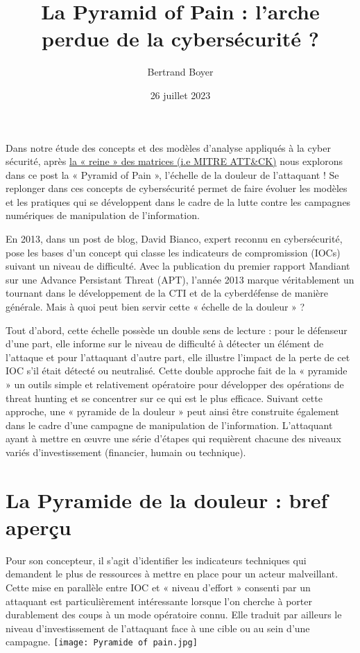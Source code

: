 \documentclass[a4paper]{article}
\title{La Pyramid of Pain : l'arche perdue de la cybersécurité ?}
\author{Bertrand Boyer} %
\date{26 juillet 2023}
\begin{document}
\maketitle                 


Dans notre étude des concepts et des modèles d’analyse appliqués à la cyber sécurité, après \href{https://www.m82-project.com/post/disarm-un-pas-vers-la-cti-pour-lutter-contre-la-désinformation}{la « reine » des matrices (i.e MITRE ATT\&CK)} nous explorons dans ce post la « Pyramid of Pain », l’échelle de la douleur de l’attaquant ! Se replonger dans ces concepts de cybersécurité permet de faire évoluer les modèles et les pratiques qui se développent dans le cadre de la lutte contre les campagnes numériques de manipulation de l’information. 

En 2013, dans un post de blog, David Bianco, expert reconnu en cybersécurité, pose les bases d’un concept qui classe les indicateurs de compromission (IOCs) suivant un niveau de difficulté. Avec la publication du premier rapport Mandiant sur une Advance Persistant Threat (APT), l’année 2013 marque véritablement un tournant dans le développement de la CTI et de la cyberdéfense de manière générale. Mais à quoi peut bien servir cette « échelle de la douleur » ? 

Tout d’abord, cette échelle possède un double sens de lecture : pour le défenseur d'une part, elle informe sur le niveau de difficulté à détecter un élément de l'attaque et pour l'attaquant d’autre part, elle illustre l’impact de la perte de cet IOC s’il était détecté ou neutralisé. Cette double approche fait de la « pyramide » un outils simple et relativement opératoire pour développer des opérations de threat hunting et se concentrer sur ce qui est le plus efficace. Suivant cette approche, une « pyramide de la douleur » peut ainsi être construite également dans le cadre d’une campagne de manipulation de l’information. L’attaquant ayant à mettre en œuvre une série d’étapes qui requièrent chacune des niveaux variés d’investissement (financier, humain ou technique). 

\section{La Pyramide de la douleur : bref aperçu}
Pour son concepteur, il s’agit d’identifier les indicateurs techniques qui demandent le plus de ressources à mettre en place pour un acteur malveillant. Cette mise en parallèle entre IOC et « niveau d’effort » consenti par un attaquant est particulièrement intéressante lorsque l’on cherche à porter durablement des coups à un mode opératoire connu. Elle traduit par ailleurs le niveau d’investissement de l’attaquant face à une cible ou au sein d’une campagne.
\texttt{[image: Pyramide of pain.jpg]}
\end{document}
